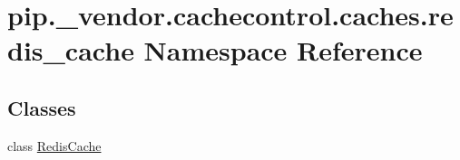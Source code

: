\hypertarget{namespacepip_1_1__vendor_1_1cachecontrol_1_1caches_1_1redis__cache}{}\section{pip.\+\_\+vendor.\+cachecontrol.\+caches.\+redis\+\_\+cache Namespace Reference}
\label{namespacepip_1_1__vendor_1_1cachecontrol_1_1caches_1_1redis__cache}
\subsection*{Classes}
\begin{DoxyCompactItemize}
\item 
class \hyperlink{classpip_1_1__vendor_1_1cachecontrol_1_1caches_1_1redis__cache_1_1RedisCache}{Redis\+Cache}
\end{DoxyCompactItemize}

